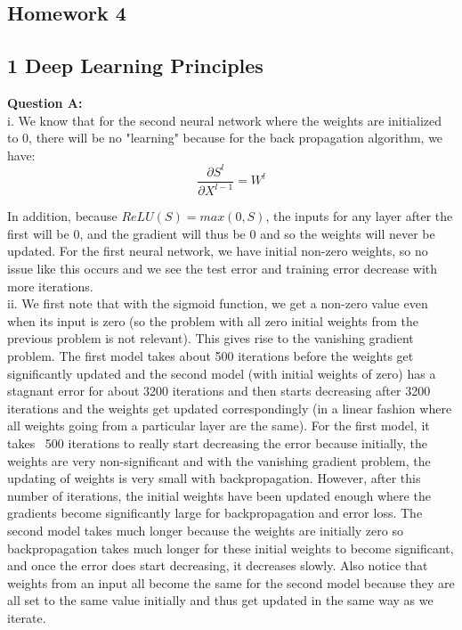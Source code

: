 \documentclass[12 pt]{article}
\begin{document}
	\begin{center}
		\section*{Homework 4}
	\end{center}
	
	
	\subsection*{1 Deep Learning Principles}	
	\noindent\textbf{Question A:}  \\ 
	i. We know that for the second neural network where the weights are initialized to 0, there will be no "learning" because for the back propagation algorithm, we have:
	\begin{equation}
	\frac{\partial S^l}{\partial X^{l-1}} = W^l
	\end{equation}
	
	\noindent In addition, because $ReLU(S) = max(0,S)$, the inputs for any layer after the first will be 0, and the gradient will thus be 0 and so the weights will never be updated. For the first neural network, we have initial non-zero weights, so no issue like this occurs and we see the test error and training error decrease with more iterations.\\
	
	\noindent ii. We first note that with the sigmoid function, we get a non-zero value even when its input is zero (so the problem with all zero initial weights from the previous problem is not relevant). This gives rise to the vanishing gradient problem. The first model takes about 500 iterations before the weights get significantly updated and the second model (with initial weights of zero) has a stagnant error for about 3200 iterations and then starts decreasing after 3200 iterations and the weights get updated correspondingly (in a linear fashion where all weights going from a particular layer are the same). For the first model, it takes ~500 iterations to really start decreasing the error because initially, the weights are very non-significant and with the vanishing gradient problem, the updating of weights is very small with backpropagation. However, after this number of iterations, the initial weights have been updated enough where the gradients become significantly large for backpropagation and error loss. The second model takes much longer because the weights are initially zero so backpropagation takes much longer for these initial weights to become significant, and once the error does start decreasing, it decreases slowly. Also notice that weights from an input all become the same for the second model because they are all set to the same value initially and thus get updated in the same way as we iterate.  \\
\end{document}
